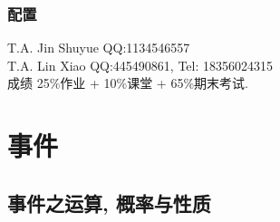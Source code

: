 \documentclass{ctexart}
\begin{document}
\subsubsection*{配置} %
\label{ssub:配置}

\noindent
T.A. Jin Shuyue QQ:1134546557\\
T.A. Lin Xiao QQ:445490861, Tel: 18356024315\\

成绩 25\%作业 + 10\%课堂 + 65\%期末考试.


\section{事件} %
\label{sec:事件}

\subsection{事件之运算, 概率与性质} %
\label{sub:事件之运算_概率与性质}
\end{document}
